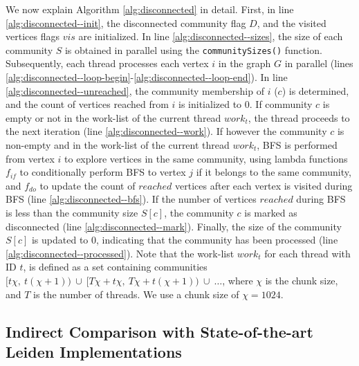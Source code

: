 

We now explain Algorithm \ref{alg:disconnected} in detail. First, in line \ref{alg:disconnected--init}, the disconnected community flag $D$, and the visited vertices flags $vis$ are initialized. In line \ref{alg:disconnected--sizes}, the size of each community $S$ is obtained in parallel using the \texttt{communitySizes()} function. Subsequently, each thread processes each vertex $i$ in the graph $G$ in parallel (lines \ref{alg:disconnected--loop-begin}-\ref{alg:disconnected--loop-end}). In line \ref{alg:disconnected--unreached}, the community membership of $i$ ($c$) is determined, and the count of vertices reached from $i$ is initialized to $0$. If community $c$ is empty or not in the work-list of the current thread $work_t$, the thread proceeds to the next iteration (line \ref{alg:disconnected--work}). If however the community $c$ is non-empty and in the work-list of the current thread $work_t$, BFS is performed from vertex $i$ to explore vertices in the same community, using lambda functions $f_{if}$ to conditionally perform BFS to vertex $j$ if it belongs to the same community, and $f_{do}$ to update the count of $reached$ vertices after each vertex is visited during BFS (line \ref{alg:disconnected--bfs}). If the number of vertices $reached$ during BFS is less than the community size $S[c]$, the community $c$ is marked as disconnected (line \ref{alg:disconnected--mark}). Finally, the size of the community $S[c]$ is updated to $0$, indicating that the community has been processed (line \ref{alg:disconnected--processed}). Note that the work-list $work_t$ for each thread with ID $t$, is defined as a set containing communities $[t\chi,\ t(\chi+1))\ \cup\ [T\chi + t\chi,\ T\chi + t(\chi+1))\ \cup\ \ldots$, where $\chi$ is the chunk size, and $T$ is the number of threads. We use a chunk size of $\chi = 1024$.




\subsection{Indirect Comparison with State-of-the-art Leiden Implementations}
\label{sec:comparison-indirect}

